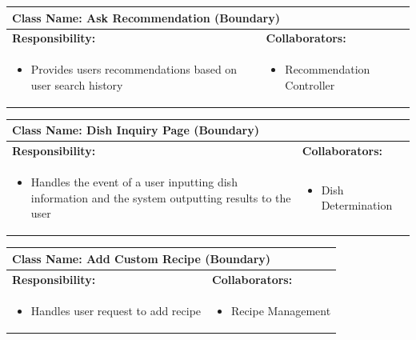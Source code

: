 \documentclass[]{article}
\begin{document}
\begin{table}[H]
	\centering
	\begin{tabular}{|p{7cm}|p{7cm}|}
	\hline 
	 \multicolumn{2}{|l|}{\textbf{Class Name:} Ask Recommendation (Boundary)} \\
	\hline
	\textbf{Responsibility:} & \textbf{Collaborators:} \\
	\hline
	\raggedright
	\begin{itemize}
		\item Provides users recommendations based on user search history
	\end{itemize}
	\vspace{1in} & 
	\begin{itemize}
		\item Recommendation Controller
	\end{itemize} \\
	\hline
	\end{tabular}
\end{table}

\begin{table}[H]
	\centering
	\begin{tabular}{|p{7cm}|p{7cm}|}
	\hline 
	 \multicolumn{2}{|l|}{\textbf{Class Name:} Dish Inquiry Page (Boundary)} \\
	\hline
	\textbf{Responsibility:} & \textbf{Collaborators:} \\
	\hline
	\raggedright
	\begin{itemize}
		\item Handles the event of a user inputting dish information and the system outputting results to the user
	\end{itemize}
	\vspace{1in} & 
	\begin{itemize}
		\item Dish Determination
	\end{itemize} \\
	\hline
	\end{tabular}
\end{table}

\begin{table}[H]
	\centering
	\begin{tabular}{|p{7cm}|p{7cm}|}
	\hline 
	 \multicolumn{2}{|l|}{\textbf{Class Name:} Add Custom Recipe (Boundary)} \\
	\hline
	\textbf{Responsibility:} & \textbf{Collaborators:} \\
	\hline
	\raggedright
	\begin{itemize}
		\item Handles user request to add recipe
	\end{itemize}
	\vspace{1in} & 
	\begin{itemize}
		\item Recipe Management
	\end{itemize} \\
	\hline
	\end{tabular}
\end{table}
\end{document}
